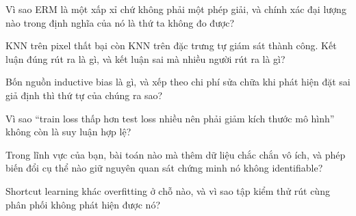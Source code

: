 \documentclass[../../deep_learning.tex]{subfiles}
\begin{document}
\begin{tukiem}
\item Vì sao ERM là một xấp xỉ chứ không phải một phép giải, và chính xác đại lượng nào trong định nghĩa của nó là thứ ta không đo được?
\item KNN trên pixel thất bại còn KNN trên đặc trưng tự giám sát thành công. Kết luận đúng rút ra là gì, và kết luận sai mà nhiều người rút ra là gì?
\item Bốn nguồn inductive bias là gì, và xếp theo chi phí sửa chữa khi phát hiện đặt sai giả định thì thứ tự của chúng ra sao?
\item Vì sao ``train loss thấp hơn test loss nhiều nên phải giảm kích thước mô hình'' không còn là suy luận hợp lệ?
\item Trong lĩnh vực của bạn, bài toán nào mà thêm dữ liệu chắc chắn vô ích, và phép biến đổi cụ thể nào giữ nguyên quan sát chứng minh nó không identifiable?
\item Shortcut learning khác overfitting ở chỗ nào, và vì sao tập kiểm thử rút cùng phân phối không phát hiện được nó?
\end{tukiem}
\ifSubfilesClassLoaded{\printbibliography[title={Nguồn}]}{}
\end{document}
